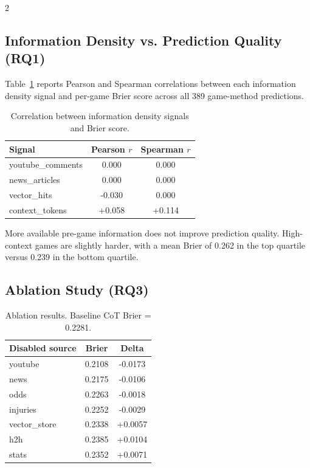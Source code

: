 \documentclass[11pt]{article}
\begin{document}
\begin{multicols}{2}
\subsection{Information Density vs. Prediction Quality (RQ1)}

Table~\ref{tab:density} reports Pearson and Spearman correlations between each information density signal and per-game Brier score across all 389 game-method predictions.

\begin{table}[H]
\centering
\caption{Correlation between information density signals and Brier score.}
\label{tab:density}
\begin{tabular}{lcc}
\toprule
Signal & Pearson $r$ & Spearman $r$ \\
\midrule
youtube\_comments & 0.000 & 0.000 \\
news\_articles    & 0.000 & 0.000 \\
vector\_hits      & -0.030 & 0.000 \\
context\_tokens   & +0.058 & +0.114 \\
\bottomrule
\end{tabular}
\end{table}

More available pre-game information does not improve prediction quality. High-context games are slightly harder, with a mean Brier of 0.262 in the top quartile versus 0.239 in the bottom quartile.

\subsection{Ablation Study (RQ3)}

\begin{table}[H]
\centering
\caption{Ablation results. Baseline CoT Brier = 0.2281.}
\label{tab:ablation}
\begin{tabular}{lcc}
\toprule
Disabled source & Brier & Delta \\
\midrule
youtube      & 0.2108 & -0.0173 \\
news         & 0.2175 & -0.0106 \\
odds         & 0.2263 & -0.0018 \\
injuries     & 0.2252 & -0.0029 \\
vector\_store & 0.2338 & +0.0057 \\
h2h          & 0.2385 & +0.0104 \\
stats        & 0.2352 & +0.0071 \\
\bottomrule
\end{tabular}
\end{table}


\end{multicols}
\end{document}
